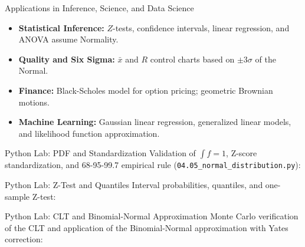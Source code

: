 \documentclass[aspectratio=169,xcolor={dvipsnames,table}]{beamer}
\begin{document}
\begin{frame}{Applications in Inference, Science, and Data Science}
	\vspace{-0.1cm}
	\begin{itemize}\itemsep=0.1cm
		\item \textbf{Statistical Inference:} $Z$-tests, confidence intervals, linear regression, and ANOVA assume Normality. \pause
		\item \textbf{Quality and Six Sigma:} $\bar{x}$ and $R$ control charts based on $\pm 3\sigma$ of the Normal. \pause
		\item \textbf{Finance:} Black-Scholes model for option pricing; geometric Brownian motions. \pause
		\item \textbf{Machine Learning:} Gaussian linear regression, generalized linear models, and likelihood function approximation.
	\end{itemize}
\end{frame}

\begin{frame}[fragile]{Python Lab: PDF and Standardization}
	\vspace{-0.05cm}
	\scriptsize
	Validation of $\int f = 1$, Z-score standardization, and 68-95-99.7 empirical rule (\texttt{04.05\_normal\_distribution.py}):
	\vspace{0.02cm}
	{
	}
\end{frame}

\begin{frame}[fragile]{Python Lab: Z-Test and Quantiles}
	\vspace{-0.05cm}
	\scriptsize
	Interval probabilities, quantiles, and one-sample Z-test:
	\vspace{0.02cm}
	{
	}
\end{frame}

\begin{frame}[fragile]{Python Lab: CLT and Binomial-Normal Approximation}
	\vspace{-0.05cm}
	\scriptsize
	Monte Carlo verification of the CLT and application of the Binomial-Normal approximation with Yates correction:
	\vspace{0.02cm}
	{
	}
\end{frame}
\end{document}
